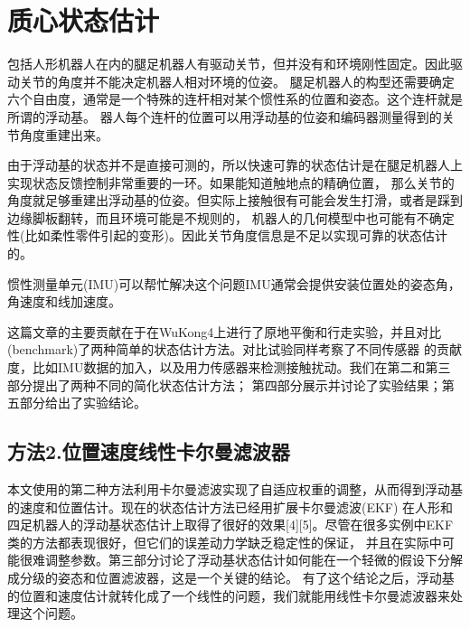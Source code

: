 \section{质心状态估计}
包括人形机器人在内的腿足机器人有驱动关节，但并没有和环境刚性固定。因此驱动关节的角度并不能决定机器人相对环境的位姿。
腿足机器人的构型还需要确定六个自由度，通常是一个特殊的连杆相对某个惯性系的位置和姿态。这个连杆就是所谓的浮动基。
器人每个连杆的位置可以用浮动基的位姿和编码器测量得到的关节角度重建出来。

由于浮动基的状态并不是直接可测的，所以快速可靠的状态估计是在腿足机器人上实现状态反馈控制非常重要的一环。如果能知道触地点的精确位置，
那么关节的角度就足够重建出浮动基的位姿。但实际上接触很有可能会发生打滑，或者是踩到边缘脚板翻转，而且环境可能是不规则的，
机器人的几何模型中也可能有不确定性(比如柔性零件引起的变形)。因此关节角度信息是不足以实现可靠的状态估计的。

惯性测量单元(IMU)可以帮忙解决这个问题IMU通常会提供安装位置处的姿态角，角速度和线加速度。



这篇文章的主要贡献在于在WuKong4上进行了原地平衡和行走实验，并且对比(benchmark)了两种简单的状态估计方法。对比试验同样考察了不同传感器
的贡献度，比如IMU数据的加入，以及用力传感器来检测接触扰动。我们在第二和第三部分提出了两种不同的简化状态估计方法；
第四部分展示并讨论了实验结果；第五部分给出了实验结论。

\subsection{方法2.位置速度线性卡尔曼滤波器}
本文使用的第二种方法利用卡尔曼滤波实现了自适应权重的调整，从而得到浮动基的速度和位置估计。现在的状态估计方法已经用扩展卡尔曼滤波(EKF)
在人形和四足机器人的浮动基状态估计上取得了很好的效果[4][5]。尽管在很多实例中EKF类的方法都表现很好，但它们的误差动力学缺乏稳定性的保证，
并且在实际中可能很难调整参数。第三部分讨论了浮动基状态估计如何能在一个轻微的假设下分解成分级的姿态和位置滤波器，这是一个关键的结论。
有了这个结论之后，浮动基的位置和速度估计就转化成了一个线性的问题，我们就能用线性卡尔曼滤波器来处理这个问题。

